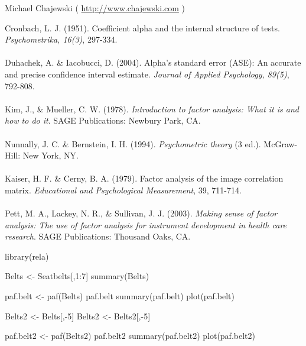 \begin{Author}\relax
Michael Chajewski ( \url{http://www.chajewski.com} )
\end{Author}
\begin{References}\relax
Cronbach, L. J. (1951). Coefficient alpha and the internal structure of tests. \emph{Psychometrika, 16(3)}, 297-334. \\
\\
Duhachek, A. \& Iacobucci, D. (2004). Alpha's standard error (ASE): An accurate and precise confidence interval estimate. \emph{Journal of Applied Psychology, 89(5)}, 792-808. \\
\\
Kim, J., \& Mueller, C. W. (1978). \emph{Introduction to factor analysis: What it is and how to do it}. SAGE Publications: Newbury Park, CA. \\
\\
Nunnally, J. C. \& Bernstein, I. H. (1994). \emph{Psychometric theory} (3 ed.). McGraw-Hill: New York, NY. \\
\\
Kaiser, H. F. \& Cerny, B. A. (1979). Factor analysis of the image correlation matrix. \emph{Educational and Psychological Measurement}, 39, 711-714.\\
\\
Pett, M. A., Lackey, N. R., \& Sullivan, J. J. (2003). \emph{Making sense of factor analysis: The use of factor analysis for instrument development in health care research}. SAGE Publications: Thousand Oaks, CA.
\end{References}
\begin{Examples}
\begin{ExampleCode}

library(rela)

Belts <- Seatbelts[,1:7]
summary(Belts)

paf.belt <- paf(Belts)
paf.belt
summary(paf.belt)
plot(paf.belt)

Belts2 <- Belts[,-5]
Belts2 <- Belts2[,-5] 

paf.belt2 <- paf(Belts2)
paf.belt2
summary(paf.belt2)
plot(paf.belt2)
\end{ExampleCode}
\end{Examples}

